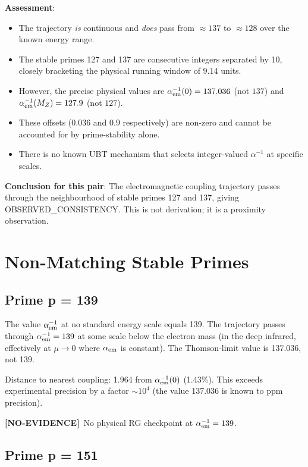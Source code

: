 \documentclass[12pt,a4paper]{article}
\theoremstyle{definition}
\theoremstyle{remark}
\newcommand{\noev}{\textcolor{red!65!black}{\textbf{[NO-EVIDENCE]}}}
\begin{document}
\textbf{Assessment}:
\begin{itemize}
\item The trajectory \emph{is} continuous and \emph{does} pass from $\approx 137$ to
      $\approx 128$ over the known energy range.
\item The stable primes 127 and 137 are consecutive integers separated by 10,
      closely bracketing the physical running window of $9.14$ units.
\item However, the precise physical values are $\alpha_{\rm em}^{-1}(0) = 137.036$
      (not $137$) and $\alpha_{\rm em}^{-1}(M_Z) = 127.9$ (not $127$).
\item These offsets (0.036 and 0.9 respectively) are non-zero and cannot be
      accounted for by prime-stability alone.
\item There is no known UBT mechanism that selects integer-valued $\alpha^{-1}$ at
      specific scales.
\end{itemize}

\textbf{Conclusion for this pair}: The electromagnetic coupling trajectory
passes through the neighbourhood of stable primes 127 and 137, giving
OBSERVED\_CONSISTENCY.  This is not derivation; it is a proximity observation.

\section{Non-Matching Stable Primes}

\subsection{Prime p = 139}

The value $\alpha_{\rm em}^{-1}$ at no standard energy scale equals 139.
The trajectory passes through $\alpha_{\rm em}^{-1} = 139$ at some scale
below the electron mass (in the deep infrared, effectively at $\mu \to 0$
where $\alpha_{\rm em}$ is constant).  The Thomson-limit value is 137.036,
not 139.

Distance to nearest coupling: 1.964 from $\alpha_{\rm em}^{-1}(0)$ (1.43\%).
This exceeds experimental precision by a factor $\sim 10^4$ (the value
137.036 is known to ppm precision).

\noev\ No physical RG checkpoint at $\alpha_{\rm em}^{-1} = 139$.

\subsection{Prime p = 151}
\end{document}
